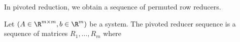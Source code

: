 

In pivoted reduction, we obtain a sequence of permuted row reducers.


Let $(A \in \R^{m \times m}, b \in \R^{m})$ be a system.
The pivoted reducer sequence is a sequence of matrices $R_1, \dots, R_m$ where 

\blankpage
